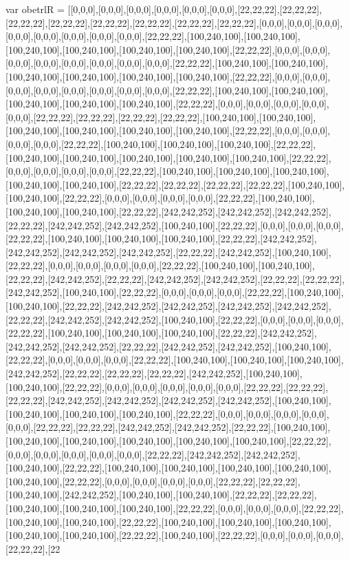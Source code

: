 var obetrlR = [[0,0,0],[0,0,0],[0,0,0],[0,0,0],[0,0,0],[0,0,0],[22,22,22],[22,22,22],[22,22,22],[22,22,22],[22,22,22],[22,22,22],[22,22,22],[22,22,22],[0,0,0],[0,0,0],[0,0,0],[0,0,0],[0,0,0],[0,0,0],[0,0,0],[0,0,0],[22,22,22],[100,240,100],[100,240,100],[100,240,100],[100,240,100],[100,240,100],[100,240,100],[22,22,22],[0,0,0],[0,0,0],[0,0,0],[0,0,0],[0,0,0],[0,0,0],[0,0,0],[0,0,0],[22,22,22],[100,240,100],[100,240,100],[100,240,100],[100,240,100],[100,240,100],[100,240,100],[22,22,22],[0,0,0],[0,0,0],[0,0,0],[0,0,0],[0,0,0],[0,0,0],[0,0,0],[0,0,0],[22,22,22],[100,240,100],[100,240,100],[100,240,100],[100,240,100],[100,240,100],[22,22,22],[0,0,0],[0,0,0],[0,0,0],[0,0,0],[0,0,0],[22,22,22],[22,22,22],[22,22,22],[22,22,22],[100,240,100],[100,240,100],[100,240,100],[100,240,100],[100,240,100],[100,240,100],[22,22,22],[0,0,0],[0,0,0],[0,0,0],[0,0,0],[22,22,22],[100,240,100],[100,240,100],[100,240,100],[22,22,22],[100,240,100],[100,240,100],[100,240,100],[100,240,100],[100,240,100],[22,22,22],[0,0,0],[0,0,0],[0,0,0],[0,0,0],[22,22,22],[100,240,100],[100,240,100],[100,240,100],[100,240,100],[100,240,100],[22,22,22],[22,22,22],[22,22,22],[22,22,22],[100,240,100],[100,240,100],[22,22,22],[0,0,0],[0,0,0],[0,0,0],[0,0,0],[22,22,22],[100,240,100],[100,240,100],[100,240,100],[22,22,22],[242,242,252],[242,242,252],[242,242,252],[22,22,22],[242,242,252],[242,242,252],[100,240,100],[22,22,22],[0,0,0],[0,0,0],[0,0,0],[22,22,22],[100,240,100],[100,240,100],[100,240,100],[22,22,22],[242,242,252],[242,242,252],[242,242,252],[242,242,252],[22,22,22],[242,242,252],[100,240,100],[22,22,22],[0,0,0],[0,0,0],[0,0,0],[0,0,0],[22,22,22],[100,240,100],[100,240,100],[22,22,22],[242,242,252],[22,22,22],[242,242,252],[242,242,252],[22,22,22],[22,22,22],[242,242,252],[100,240,100],[22,22,22],[0,0,0],[0,0,0],[0,0,0],[22,22,22],[100,240,100],[100,240,100],[22,22,22],[242,242,252],[242,242,252],[242,242,252],[242,242,252],[22,22,22],[242,242,252],[242,242,252],[100,240,100],[22,22,22],[0,0,0],[0,0,0],[0,0,0],[22,22,22],[100,240,100],[100,240,100],[100,240,100],[22,22,22],[242,242,252],[242,242,252],[242,242,252],[22,22,22],[242,242,252],[242,242,252],[100,240,100],[22,22,22],[0,0,0],[0,0,0],[0,0,0],[22,22,22],[100,240,100],[100,240,100],[100,240,100],[242,242,252],[22,22,22],[22,22,22],[22,22,22],[242,242,252],[100,240,100],[100,240,100],[22,22,22],[0,0,0],[0,0,0],[0,0,0],[0,0,0],[0,0,0],[22,22,22],[22,22,22],[22,22,22],[242,242,252],[242,242,252],[242,242,252],[242,242,252],[100,240,100],[100,240,100],[100,240,100],[100,240,100],[22,22,22],[0,0,0],[0,0,0],[0,0,0],[0,0,0],[0,0,0],[22,22,22],[22,22,22],[242,242,252],[242,242,252],[22,22,22],[100,240,100],[100,240,100],[100,240,100],[100,240,100],[100,240,100],[100,240,100],[22,22,22],[0,0,0],[0,0,0],[0,0,0],[0,0,0],[0,0,0],[22,22,22],[242,242,252],[242,242,252],[100,240,100],[22,22,22],[100,240,100],[100,240,100],[100,240,100],[100,240,100],[100,240,100],[22,22,22],[0,0,0],[0,0,0],[0,0,0],[0,0,0],[22,22,22],[22,22,22],[100,240,100],[242,242,252],[100,240,100],[100,240,100],[22,22,22],[22,22,22],[100,240,100],[100,240,100],[100,240,100],[22,22,22],[0,0,0],[0,0,0],[0,0,0],[22,22,22],[100,240,100],[100,240,100],[22,22,22],[100,240,100],[100,240,100],[100,240,100],[100,240,100],[100,240,100],[22,22,22],[100,240,100],[22,22,22],[0,0,0],[0,0,0],[0,0,0],[22,22,22],[22